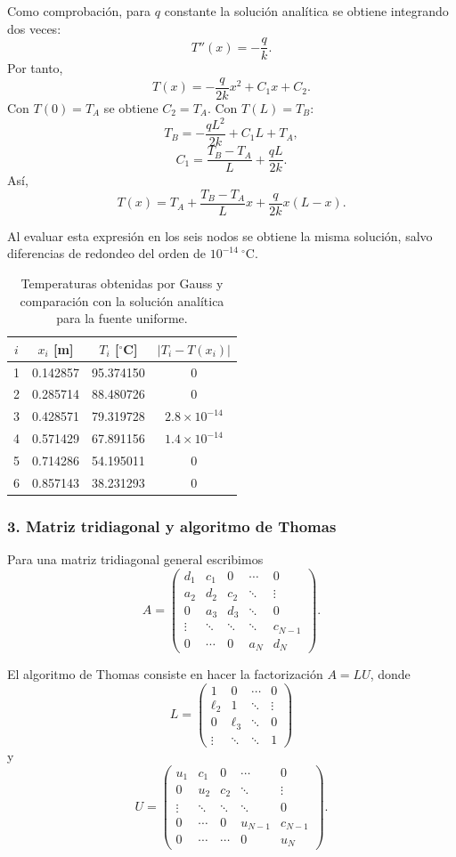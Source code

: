 \documentclass[11pt,a4paper]{article}
\begin{document}
Como comprobación, para $q$ constante la solución analítica se obtiene integrando dos veces:
\[
T''(x)=-\frac{q}{k}.
\]
Por tanto,
\[
T(x)=-\frac{q}{2k}x^2+C_1x+C_2.
\]
Con $T(0)=T_A$ se obtiene $C_2=T_A$. Con $T(L)=T_B$:
\[
T_B=-\frac{qL^2}{2k}+C_1L+T_A,
\]
\[
C_1=\frac{T_B-T_A}{L}+\frac{qL}{2k}.
\]
Así,
\begin{equation}
\boxed{T(x)=T_A+\frac{T_B-T_A}{L}x+\frac{q}{2k}x(L-x).}
\end{equation}

Al evaluar esta expresión en los seis nodos se obtiene la misma solución, salvo diferencias de redondeo del orden de $10^{-14}\ ^\circ$C.

\begin{table}[H]
\centering
\caption{Temperaturas obtenidas por Gauss y comparación con la solución analítica para la fuente uniforme.}
\begin{tabular}{cccc}
\toprule
$i$ & $x_i$ [m] & $T_i$ [${}^{\circ}$C] & $|T_i-T(x_i)|$ \\
\midrule
1&0.142857&95.374150&$0$\\
2&0.285714&88.480726&$0$\\
3&0.428571&79.319728&$2.8\times10^{-14}$\\
4&0.571429&67.891156&$1.4\times10^{-14}$\\
5&0.714286&54.195011&$0$\\
6&0.857143&38.231293&$0$\\
\bottomrule
\end{tabular}
\end{table}

\subsubsection*{3. Matriz tridiagonal y algoritmo de Thomas}

Para una matriz tridiagonal general escribimos
\begin{equation}
A=
\begin{pmatrix}
 d_1&c_1&0&\cdots&0\\
 a_2&d_2&c_2&\ddots&\vdots\\
 0&a_3&d_3&\ddots&0\\
 \vdots&\ddots&\ddots&\ddots&c_{N-1}\\
 0&\cdots&0&a_N&d_N
\end{pmatrix}.
\end{equation}

El algoritmo de Thomas consiste en hacer la factorización $A=LU$, donde
\[
L=
\begin{pmatrix}
1&0&\cdots&0\\
\ell_2&1&\ddots&\vdots\\
0&\ell_3&\ddots&0\\
\vdots&\ddots&\ddots&1
\end{pmatrix}
\]
y
\[
U=
\begin{pmatrix}
 u_1&c_1&0&\cdots&0\\
 0&u_2&c_2&\ddots&\vdots\\
 \vdots&\ddots&\ddots&\ddots&0\\
 0&\cdots&0&u_{N-1}&c_{N-1}\\
 0&\cdots&\cdots&0&u_N
\end{pmatrix}.
\]
\end{document}

